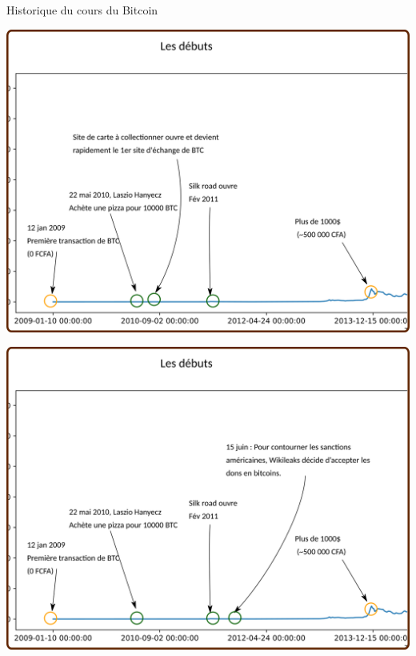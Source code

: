 \documentclass[presentation]{beamer}
\begin{document}
\begin{frame}[label={sec:org6ff9387}]{Historique du cours du Bitcoin}
\begin{block}{}
\begin{center}
\includegraphics[width=.95\textwidth]{./Pictures/Timeline/06debut_silk.png}
\end{center}
\end{block}

\begin{block}{}
\begin{center}
\includegraphics[width=.95\textwidth]{./Pictures/Timeline/07debut_wiki.png}
\end{center}
\end{block}


\end{frame}
\end{document}
